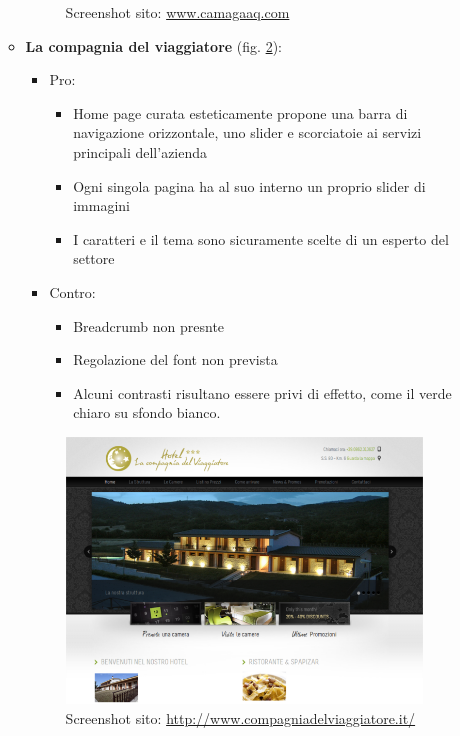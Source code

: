 \documentclass[a4paper,12pt,hidelinks]{report}
\begin{document}
\begin{itemize}
\begin{itemize}
\begin{figure}[h!]
	    \centering
	    \caption{Screenshot sito: \url{www.camagaaq.com}}%
	    \label{fig:bebCamaga}%
	  \end{figure}
      \item \textbf{La compagnia del viaggiatore} (fig. \ref{fig:bebViaggiatore}):
	\begin{itemize}
	 \item Pro:
	  \begin{itemize}
	   \item Home page curata esteticamente propone una barra di navigazione orizzontale, uno slider e scorciatoie ai servizi principali dell'azienda
	   \item Ogni singola pagina ha al suo interno un proprio slider di immagini
	   \item I caratteri e il tema sono sicuramente scelte  di un esperto del settore
	  \end{itemize}
	 \item Contro:
	  \begin{itemize}
	   \item Breadcrumb non presnte
	   \item Regolazione del font non prevista
	   \item Alcuni contrasti risultano essere privi di effetto, come il verde chiaro su sfondo bianco.
	  \end{itemize}
	\end{itemize}
	\begin{figure}[h!]%
	    \includegraphics[width=0.95\textwidth,keepaspectratio=true]{img/bebViaggiatore}
	    \centering
	    \caption{Screenshot sito: \url{http://www.compagniadelviaggiatore.it/}}%
	    \label{fig:bebViaggiatore}%

\end{figure}
\end{itemize}
\end{itemize}
\end{document}

